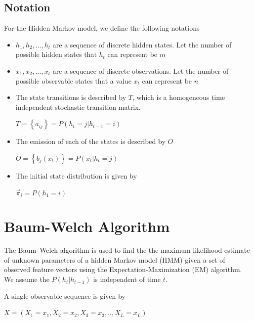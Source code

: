\documentclass[letterpaper]{article}
\begin{document}
\subsection{Notation}
For the Hidden Markov model, we define the following notations
\begin{itemize}
	\item $h_{1}, h_{2}, ..., h_{t}$ are a sequence of discrete hidden states. Let the number of possible hidden states that $h_{t}$ can represent be $m$
	      	      	      
	\item $x_{1}, x_{2}, ..., x_{t}$ are a sequence of discrete observations. Let the number of possible observable states that a value $x_{t}$ can represent be $n$
	      	      	      
	\item  The state transitions is described by $T$, which is a homogeneous time independent stochastic transition matrix. 
	      \begin{center}
	      	$T = \left\lbrace a_{ij} \right\rbrace = P(h_{t}=j|h_{t-1}=i)$
	      \end{center}
	      	      	      
	\item The emission of each of the states is described by $O$
	      \begin{center}
	      	$O = \left\lbrace b_{j}(x_{t}) \right\rbrace = P(x_{t}|h_{t}=j)$
	      \end{center}
	      	      	      
	\item The initial state distribution is given by
	      \begin{center}
	      	$\vec \pi_{i} = P(h_{1}=i)$
	      \end{center}
\end{itemize}

\section{Baum-Welch Algorithm}
The Baum–Welch algorithm is used to find the the maximum likelihood estimate of unknown parameters of a hidden Markov model (HMM) given a set of observed feature vectors using the Expectation-Maximization (EM) algorithm. We assume the $P(h_{t}|h_{t-1})$ is independent of time $t$.

A single observable sequence is given by 
\begin{center}
	$X = (X_{1}=x_{1},X_{2}=x_{2},X_{3}=x_{3},..,X_{L}=x_{L})$
\end{center}
\end{document}

